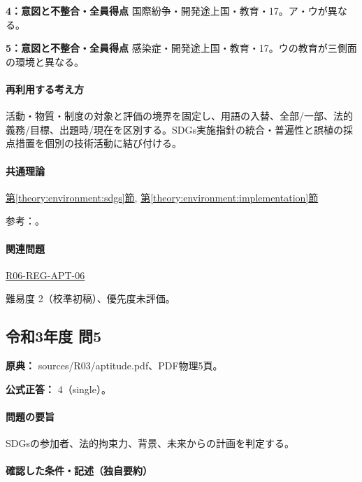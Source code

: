 \noindent\textbf{4：意図と不整合・全員得点} 国際紛争・開発途上国・教育・17。ア・ウが異なる。\par

\noindent\textbf{5：意図と不整合・全員得点} 感染症・開発途上国・教育・17。ウの教育が三側面の環境と異なる。\par

\paragraph{再利用する考え方} 活動・物質・制度の対象と評価の境界を固定し、用語の入替、全部/一部、法的義務/目標、出題時/現在を区別する。SDGs実施指針の統合・普遍性と誤植の採点措置を個別の技術活動に結び付ける。

\paragraph{共通理論} \hyperref[theory:environment:sdgs]{第\ref*{theory:environment:sdgs}節}, \hyperref[theory:environment:implementation]{第\ref*{theory:environment:implementation}節}

\par 参考：\cite{env_sdgs2016}。

\paragraph{関連問題} \hyperref[q:r06-reg-apt-06]{R06-REG-APT-06}

\par 難易度 2（校準初稿）、優先度未評価。

\subsection{令和3年度 問5}
\label{q:r03-reg-apt-05}

\noindent\textbf{原典：} sources/R03/aptitude.pdf、PDF物理5頁。

\textbf{公式正答：} 4（single）。

\paragraph{問題の要旨} SDGsの参加者、法的拘束力、背景、未来からの計画を判定する。

\paragraph{確認した条件・記述（独自要約）}\mbox{}\par

